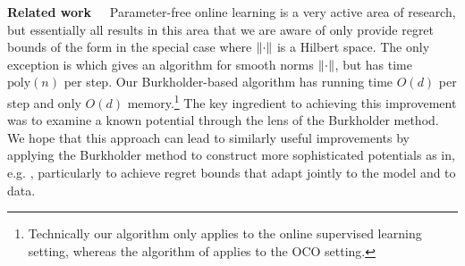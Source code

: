 \noindent\textbf{Related work~~} Parameter-free online learning is a very active area of research, but essentially all results in this area that we are aware of \citep{mcmahan2013minimax,mcmahan2014unconstrained,orabona2014simultaneous,orabona2016coin,cutkosky2016online, cutkosky2017online} only provide regret bounds of the form  in the special case where $\nrm*{\cdot}$ is a Hilbert space. The only exception is \citep{foster2017parameter} which gives an algorithm for smooth norms $\nrm*{\cdot}$, but has time $\mathrm{poly}(n)$ per step.
Our Burkholder-based algorithm has running time $O(d)$ per step and only $O(d)$ memory.\footnote{Technically our algorithm only applies to the online supervised learning setting, whereas the algorithm of \cite{foster2017parameter} applies to the OCO setting.} The key ingredient to achieving this improvement was to examine a known potential through the lens of the Burkholder method. We hope that this approach can lead to similarly useful improvements by applying the Burkholder method to construct more sophisticated potentials as in, e.g. \citep{orabona2016coin, cutkosky2017online}, particularly to achieve regret bounds that adapt jointly to the model and to data.

